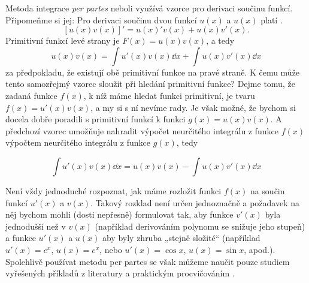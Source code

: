       Metoda integrace \emph{per partes} neboli využívá vzorce pro derivaci součinu funkcí.
      Připomeňme si jej: Pro derivaci součinu dvou funkcí \(u(x)\) a \(u(x)\) platí
      \cite[p.~137]{Musilova2009MA1}.
      \begin{equation}\label{mai:eq101}
        [u(x)v(x)]' = u(x)'v(x) + u(x)v'(x).
      \end{equation} 
      Primitivní funkcí levé strany je \(F(x) = u(x)v(x)\), a tedy
      \begin{equation*}
        u(x)v(x) =  \int u'(x)v(x)\dd{x} + \int u(x)v'(x)\dd{x}
      \end{equation*}  
      za předpokladu, že existují obě primitivní funkce na pravé straně. K čemu může tento
      samozřejmý vzorec sloužit při hledání primitivní funkce? Dejme tomu, že zadaná funkce
      \(f(x)\), k níž máme hledat funkci primitivní, je tvaru \(f(x) = u'(x)v(x)\), a my si s ní
      nevíme rady. Je však možné, že bychom si docela dobře poradili s primitivní funkcí k funkci
      \(g(x) = u(x)v(x)\). A předchozí vzorec umožňuje nahradit výpočet neurčitého integrálu z
      funkce \(f(x)\) výpočtem neurčitého integrálu z funkce \(g(x)\), tedy

      \begin{equation}\label{ma:eq_perpartes}
        \int u'(x)v(x)\dd{x} = u(x)v(x) - \int u(x)v'(x)\dd{x} 
      \end{equation}

      

      Není vždy jednoduché rozpoznat, jak máme rozložit funkci \(f(x)\) na součin funkcí \(u'(x)\) 
      a \(v(x)\). Takový rozklad není určen jednoznačně a požadavek na něj bychom mohli (dosti 
      nepřesně) formulovat tak, aby funkce \(v'(x)\) byla jednodušší než v \(v(x)\) (například 
      derivováním polynomu se snižuje jeho stupeň) a funkce \(u'(x)\) a \(u(x)\) aby byly zhruba 
      „stejně složité“ (například \(u'(x) =e^x\), \(u(x) = e^x\), nebo \(u'(x) = \cos x\), \(u(x) = 
      \sin x\), apod.). Spolehlivě používat metodu per partes se však můžeme naučit pouze studiem 
      vyřešených příkladů z literatury a praktickým procvičováním \cite[p.~138]{Musilova2009MA1}.
  
      
  
